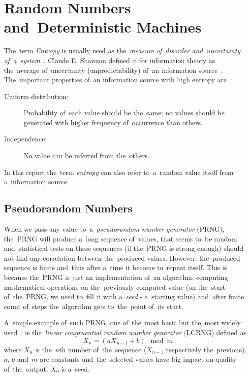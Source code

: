 \chapter{Random Numbers and~Deterministic Machines}\label{chap:randomNumbers}
\par{
The~term {\em Entropy} is usually used  as the~{\em measure of~disorder 
and~uncertainty of~a~system}~\cite{Entrophy}. Claude E. Shannon defined it 
for information theory as the~average of~uncertainty (unpredictability) 
of~an information source~\cite[p.~396]{AMathematicalTheoryOfCommunication}. 
The~important properties of~an information source with high entropy 
are~\cite[p.~150]{CryptographyAndNetworkSecurity}: 
\begin{description}
 \item [Uniform distribution:] Probability of~each value should be the~same; 
 no values should be generated with higher frequency of~occurrence than others.
 \item [Independence:] No value can be inferred from the~others.
\end{description}
}

\par{
In this report the~term {\em entropy} can also refer to~a~random value itself 
from a~information source. 
}

\par{
\section{Pseudorandom Numbers}
When we pass any value to~a~{\em pseudorandom number generator} (PRNG), 
the~PRNG will produce a~long sequence of~values, that seems to~be random 
and~statistical tests on these sequences (if the~PRNG is strong enough) 
should not find any correlation between the~produced values. However, 
the~produced sequence is finite and~thus after a~time it become to~repeat itself. 
This is because the~PRNG is just an implementation of~an algorithm, computing 
mathematical operations on the~previously computed value (on the~start 
of~the~PRNG, we need to~fill it with a~{\em seed} - a~starting value) 
and~after finite count of~steps the~algorithm gets to~the~point of~its start.
}

\par{
A~simple example of~such PRNG, one of~the~most basic but the~most widely 
used~\cite[p.~151]{CryptographyAndNetworkSecurity}, 
is the~{\em linear congruential random number generator} (LCRNG) defined as 
\begin{equation}\label{eq:LCRNG}
  X_n = (aX_{n-1} + b) \mod{m}
\end{equation}
where $X_n$ is the~$n$th number of~the~sequence ($X_{n-1}$ respectively 
the~previous). $a$, $b$ and~$m$ are constants and~the~selected values 
have big impact on quality of~the~output. $X_0$ is a~seed. 
}

